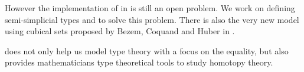 However the implementation of \hott in \itt is still an open problem. We
work on defining semi-simplicial types and \wog to solve this problem. There
is also the very new model using cubical sets proposed by Bezem,
Coquand and Huber in \cite{bezem2013model}.



\hott does not only help us model type theory with a focus on the equality, but also provides mathematicians type theoretical tools to study homotopy theory.

